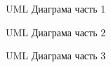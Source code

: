 \documentclass[a4paper,14pt]{report}
\begin{document}
\begin{figure}[H]
 \caption{UML Диаграма часть 1}
 \label{fig:class1}
\end{figure}

\begin{figure}[H]
 \caption{UML Диаграма часть 2}
 \label{fig:class2}
\end{figure}

\begin{figure}[H]
 \caption{UML Диаграма часть 3}
 \label{fig:class3}
\end{figure}
\end{document}
